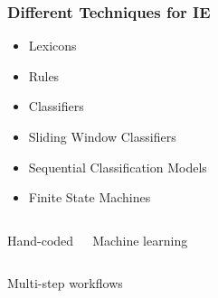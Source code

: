\documentclass{beamer}
\begin{document}
\begin{frame}
  \frametitle{Different Techniques for IE}
  \large
  \begin{block}{}
      \centering
      \begin{minipage}{.65\linewidth}
          \begin{block}{}
              \begin{itemize}
              \item Lexicons
              \item Rules
              \item Classifiers
              \item Sliding Window Classifiers
              \item Sequential Classification Models
              \item Finite State Machines
              \end{itemize}
          \end{block}
      \end{minipage}
      \begin{columns}
          \begin{exampleblock}{}
              \centering Hand-coded
          \end{exampleblock}
          \begin{exampleblock}{}
              \centering Machine learning
          \end{exampleblock}
      \end{columns}
      \begin{center}
          Multi-step workflows
      \end{center}
  \end{block}
\end{frame}
\end{document}
